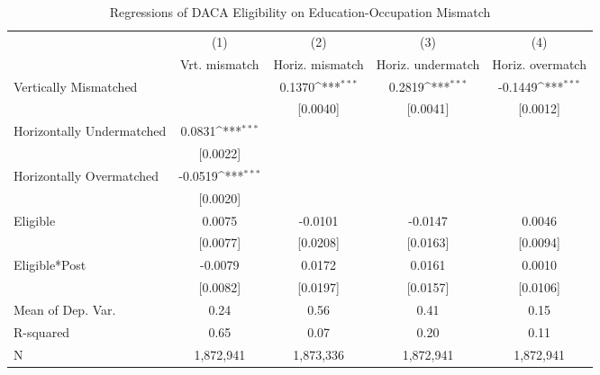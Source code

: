 \begin{table}[htbp]\centering
\def\sym#1{\ifmmode^{#1}\else\(^{#1}\)\fi}
\caption{Regressions of DACA Eligibility on Education-Occupation Mismatch}
\begin{tabular}{l*{4}{c}}
\toprule
                    &\multicolumn{1}{c}{(1)}         &\multicolumn{1}{c}{(2)}         &\multicolumn{1}{c}{(3)}         &\multicolumn{1}{c}{(4)}         \\
                    &Vrt. mismatch         &Horiz. mismatch         &Horiz. undermatch         &Horiz. overmatch         \\
\midrule
Vertically Mismatched&                     &      0.1370\sym{***}&      0.2819\sym{***}&     -0.1449\sym{***}\\
                    &                     &    [0.0040]         &    [0.0041]         &    [0.0012]         \\
\addlinespace
Horizontally Undermatched&      0.0831\sym{***}&                     &                     &                     \\
                    &    [0.0022]         &                     &                     &                     \\
\addlinespace
Horizontally Overmatched&     -0.0519\sym{***}&                     &                     &                     \\
                    &    [0.0020]         &                     &                     &                     \\
\addlinespace
Eligible            &      0.0075         &     -0.0101         &     -0.0147         &      0.0046         \\
                    &    [0.0077]         &    [0.0208]         &    [0.0163]         &    [0.0094]         \\
\addlinespace
Eligible*Post       &     -0.0079         &      0.0172         &      0.0161         &      0.0010         \\
                    &    [0.0082]         &    [0.0197]         &    [0.0157]         &    [0.0106]         \\
\midrule
Mean of Dep. Var.   &        0.24         &        0.56         &        0.41         &        0.15         \\
R-squared           &        0.65         &        0.07         &        0.20         &        0.11         \\
N                   &   1,872,941         &   1,873,336         &   1,872,941         &   1,872,941         \\

\end{tabular}
\end{table}
